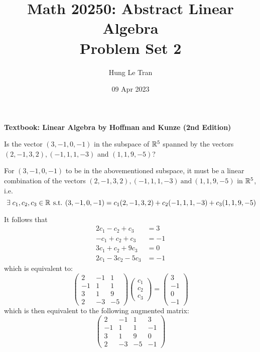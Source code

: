 \documentclass[a4paper, 10pt]{article}
\title{Math 20250: Abstract Linear Algebra \\ \large Problem Set 2}
\date{09 Apr 2023}
\author{Hung Le Tran}
\begin{document}
\maketitle
\newpage
\setcounter{section}{2}
\textbf{Textbook: Linear Algebra by Hoffman and Kunze (2nd Edition)}
\begin{problem} 
Is the vector \((3, -1, 0, -1)\) in the subspace of \(\mathbb{R}^5\) spanned by the vectors \((2, -1, 3, 2), (-1, 1, 1, -3)\) and \((1, 1, 9, -5)\)?
\end{problem}
\begin{solution}
    For \((3, -1, 0, -1)\) to be in the abovementioned subspace, it must be a linear combination of the vectors \((2, -1, 3, 2), (-1, 1, 1, -3) \:\text{and}\: (1, 1, 9, -5)\) in \(\mathbb{R}^5\), i.e. \[
        \exists c_1, c_2, c_3 \in \bbr \st (3, -1, 0, -1) = c_1(2, -1, 3, 2) + c_2(-1, 1, 1, -3) + c_3(1, 1, 9, -5)
    \]

    It follows that
    \begin{align*}
        2c_1 -c_2 + c_3   & =3   \\
        -c_1 + c_2 + c_3  & = -1 \\
        3c_1 + c_2 + 9c_3 & = 0  \\
        2c_1 -3c_2 -5c_3  & = -1
    \end{align*}
    which is equivalent to:
    \[
        \begin{pmatrix}
                2  & -1 & 1  \\
                -1 & 1  & 1  \\
                3  & 1  & 9  \\
                2  & -3 & -5
            \end{pmatrix}\begin{pmatrix}
                c_1 \\
                c_2 \\
                c_3
            \end{pmatrix} = \begin{pmatrix}
                3  \\
                -1 \\
                0  \\
                -1
            \end{pmatrix}
    \]
    which is then equivalent to the following augmented matrix:
    \[
        \left(\begin{array}{ccc|c}
                2  & -1 & 1  & 3  \\
                -1 & 1  & 1  & -1 \\
                3  & 1  & 9  & 0  \\
                2  & -3 & -5 & -1
            \end{array}\right)
    \]


\end{solution}
\end{document}
